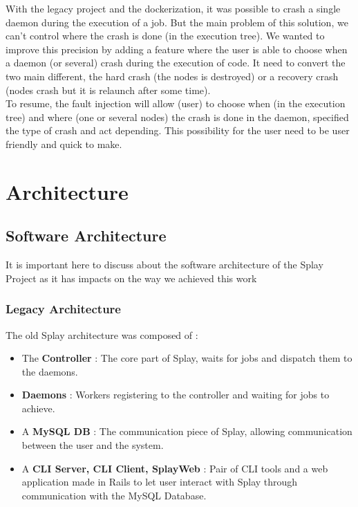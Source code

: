 \documentclass{eplmastersthesis}
\begin{document}
With the legacy project and the dockerization, it was possible to crash a single daemon during the execution of a job. But the main problem of this solution, we can't control where the crash is done (in the execution tree). We wanted to improve this precision by adding a feature where the user is able to choose when a daemon (or several) crash during the execution of code. It need to convert the two main different, the hard crash (the nodes is destroyed) or a recovery crash (nodes crash but it is relaunch after some time). \\

To resume, the fault injection will allow (user) to choose when (in the execution tree) and where (one or several nodes) the crash is done in the daemon, specified the type of crash and act depending. This possibility for the user need to be user friendly and quick to make.


  \chapter{Architecture}

    \section{Software Architecture}

      It is important here to discuss about the software architecture of the
      Splay Project as it has impacts on the way we achieved this work

      \subsection{Legacy Architecture}

        The old Splay architecture was composed of :

        \begin{itemize}
          \item The \textbf{Controller} : The core part of Splay, waits for jobs
          and dispatch them to the daemons.
          \item \textbf{Daemons} : Workers registering to the controller and waiting
          for jobs to achieve.
          \item A \textbf{MySQL DB} : The communication piece of Splay, allowing
          communication between the user and the system.
          \item A \textbf{CLI Server, CLI Client, SplayWeb} : Pair of CLI tools
          and a web application made in Rails to let user interact with
          Splay through communication with the MySQL Database.
        \end{itemize}
\end{document}
